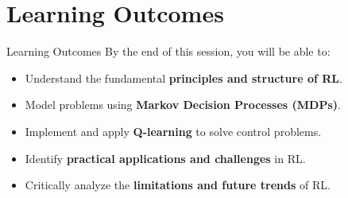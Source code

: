 \section{Learning Outcomes}
\begin{frame}{Learning Outcomes}
    \large
    By the end of this session, you will be able to:
    \vspace{0.5em}
    \begin{itemize}
        \setlength{\itemsep}{1em}
        \item Understand the fundamental \textbf{principles and structure of RL}.
        \item Model problems using \textbf{Markov Decision Processes (MDPs)}.
        \item Implement and apply \textbf{Q-learning} to solve control problems.
        \item Identify \textbf{practical applications and challenges} in RL.
        \item Critically analyze the \textbf{limitations and future trends} of RL.
    \end{itemize}
\end{frame}